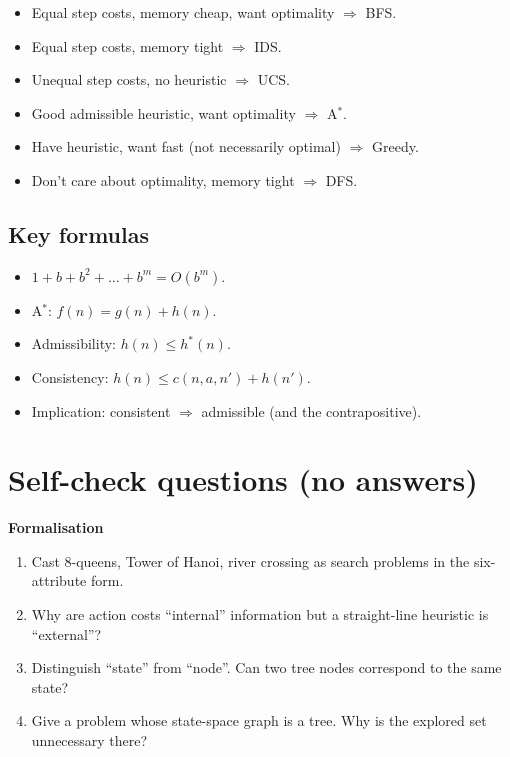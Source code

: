 \documentclass[11pt, a4paper]{article}
\begin{document}
\begin{itemize}
  \item Equal step costs, memory cheap, want optimality $\Rightarrow$ BFS.
  \item Equal step costs, memory tight $\Rightarrow$ IDS.
  \item Unequal step costs, no heuristic $\Rightarrow$ UCS.
  \item Good admissible heuristic, want optimality $\Rightarrow$ A$^{*}$.
  \item Have heuristic, want fast (not necessarily optimal) $\Rightarrow$ Greedy.
  \item Don't care about optimality, memory tight $\Rightarrow$ DFS.
\end{itemize}

\subsection{Key formulas}

\begin{itemize}
  \item $1 + b + b^2 + \dots + b^m = O(b^m)$.
  \item A$^{*}$: $f(n) = g(n) + h(n)$.
  \item Admissibility: $h(n) \le h^*(n)$.
  \item Consistency: $h(n) \le c(n,a,n') + h(n')$.
  \item Implication: consistent $\Rightarrow$ admissible (and the contrapositive).
\end{itemize}

\section{Self-check questions (no answers)}

\textbf{Formalisation}
\begin{enumerate}
  \item Cast 8-queens, Tower of Hanoi, river crossing as search problems in the six-attribute form.
  \item Why are action costs ``internal'' information but a straight-line heuristic is ``external''?
  \item Distinguish ``state'' from ``node''. Can two tree nodes correspond to the same state?
  \item Give a problem whose state-space graph is a tree. Why is the explored set unnecessary there?
\end{enumerate}
\end{document}
